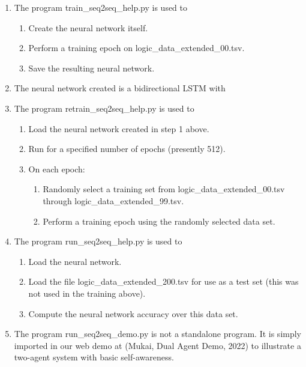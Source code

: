 \documentclass[
]{article}
\begin{document}
\begin{enumerate}
\def\labelenumi{\arabic{enumi}.}
\item
  The program train\_seq2seq\_help.py is used to

  \begin{enumerate}
  \def\labelenumii{\alph{enumii}.}
  \item
    Create the neural network itself.
  \item
    Perform a training epoch on logic\_data\_extended\_00.tsv.
  \item
    Save the resulting neural network.
  \end{enumerate}
\item
  The neural network created is a bidirectional LSTM with
\item
  The program retrain\_seq2seq\_help.py is used to

  \begin{enumerate}
  \def\labelenumii{\alph{enumii}.}
  \item
    Load the neural network created in step 1 above.
  \item
    Run for a specified number of epochs (presently 512).
  \item
    On each epoch:

    \begin{enumerate}
    \def\labelenumiii{\roman{enumiii}.}
    \item
      Randomly select a training set from logic\_data\_extended\_00.tsv
      through logic\_data\_extended\_99.tsv.
    \item
      Perform a training epoch using the randomly selected data set.
    \end{enumerate}
  \end{enumerate}
\item
  The program run\_seq2seq\_help.py is used to

  \begin{enumerate}
  \def\labelenumii{\alph{enumii}.}
  \item
    Load the neural network.
  \item
    Load the file logic\_data\_extended\_200.tsv for use as a test set
    (this was not used in the training above).
  \item
    Compute the neural network accuracy over this data set.
  \end{enumerate}
\item
  The program run\_seq2seq\_demo.py is not a standalone program. It is
  simply imported in our web demo at (Mukai, Dual Agent Demo, 2022) to
  illustrate a two-agent system with basic self-awareness.
\end{enumerate}
\end{document}
